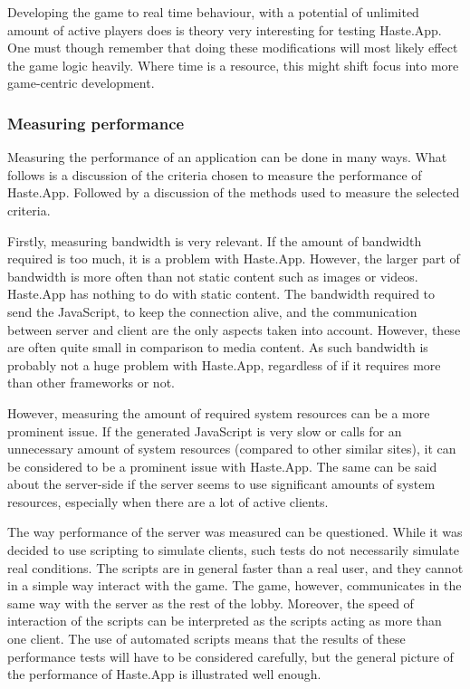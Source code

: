 \documentclass[a4paper]{article}
\begin{document}
Developing the game to real time behaviour, with a potential of unlimited amount of active players does is theory very interesting for testing Haste.App. One must though remember that doing these modifications will most likely effect the game logic heavily. Where time is a resource, this might shift focus into more game-centric development.


\subsubsection{Measuring performance}
Measuring the performance of an application can be done in many ways. What follows is a discussion of the criteria chosen to measure the performance of Haste.App. Followed by a discussion of the methods used to measure the selected criteria.

Firstly, measuring bandwidth is very relevant. If the amount of bandwidth required is too much, it is a problem with Haste.App. However, the larger part of bandwidth is more often than not static content such as images or videos. Haste.App has nothing to do with static content. The bandwidth required to send the JavaScript, to keep the connection alive, and the communication between server and client are the only aspects taken into account. However, these are often quite small in comparison to media content. As such bandwidth is probably not a huge problem with Haste.App, regardless of if it requires more than other frameworks or not.

However, measuring the amount of required system resources can be a more prominent issue. If the generated JavaScript is very slow or calls for an unnecessary amount of system resources (compared to other similar sites), it can be considered to be a prominent issue with Haste.App. The same can be said about the server-side if the server seems to use significant amounts of system resources, especially when there are a lot of active clients.

The way performance of the server was measured can be questioned. While it was decided to use scripting to simulate clients, such tests do not necessarily simulate real conditions. The scripts are in general faster than a real user, and they cannot in a simple way interact with the game. The game, however, communicates in the same way with the server as the rest of the lobby. Moreover, the speed of interaction of the scripts can be interpreted as the scripts acting as more than one client. The use of automated scripts means that the results of these performance tests will have to be considered carefully, but the general picture of the performance of Haste.App is illustrated well enough.
\end{document}
